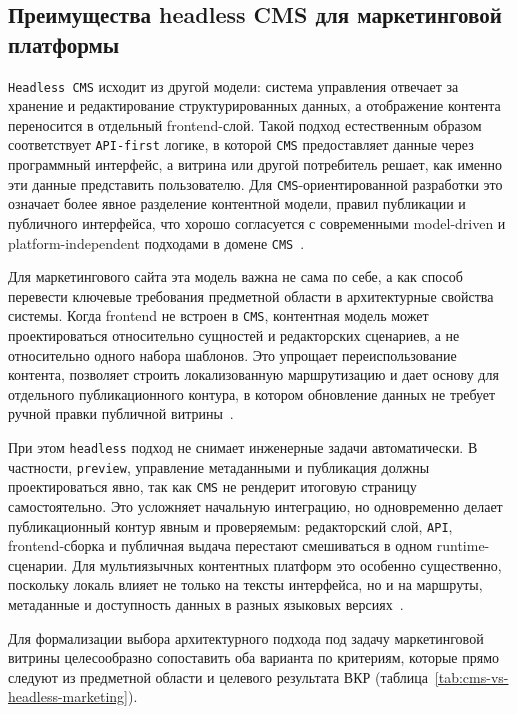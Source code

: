 \subsection{Преимущества headless CMS для маркетинговой платформы}

\texttt{Headless CMS} исходит из другой модели: система управления отвечает за хранение
и редактирование структурированных данных, а отображение контента переносится в отдельный
frontend-слой. Такой подход естественным образом соответствует \texttt{API-first} логике,
в которой \texttt{CMS} предоставляет данные через программный интерфейс, а витрина или
другой потребитель решает, как именно эти данные представить пользователю. Для
\texttt{CMS}-ориентированной разработки это означает более явное разделение контентной
модели, правил публикации и публичного интерфейса, что хорошо согласуется с современными
model-driven и platform-independent подходами в домене \texttt{CMS}~\cite{priefer2021cms-mdd-domain,gkantouna2019cms-oriented-modeling,filipe2016xis-cms}.

Для маркетингового сайта эта модель важна не сама по себе, а как способ перевести
ключевые требования предметной области в архитектурные свойства системы. Когда frontend
не встроен в \texttt{CMS}, контентная модель может проектироваться относительно сущностей
и редакторских сценариев, а не относительно одного набора шаблонов. Это упрощает
переиспользование контента, позволяет строить локализованную маршрутизацию и дает основу
для отдельного публикационного контура, в котором обновление данных не требует ручной
правки публичной витрины~\cite{santahuhta2022headless-cms,matjuhhin2026api-driven-cms,holcik2025headless-cloud}.

При этом \texttt{headless} подход не снимает инженерные задачи автоматически. В частности,
\texttt{preview}, управление метаданными и публикация должны проектироваться явно, так как
\texttt{CMS} не рендерит итоговую страницу самостоятельно. Это усложняет начальную
интеграцию, но одновременно делает публикационный контур явным и проверяемым: редакторский
слой, \texttt{API}, frontend-сборка и публичная выдача перестают смешиваться в одном
runtime-сценарии. Для мультиязычных контентных платформ это особенно существенно, поскольку
локаль влияет не только на тексты интерфейса, но и на маршруты, метаданные и доступность
данных в разных языковых версиях~\cite{santahuhta2022headless-cms,oleary2008multilingual-kms,gracia2012multilingual-web-data,solovev2023multilingual-web-app}.

Для формализации выбора архитектурного подхода под задачу маркетинговой витрины
целесообразно сопоставить оба варианта по критериям, которые прямо следуют из предметной
области и целевого результата ВКР (таблица~\ref{tab:cms-vs-headless-marketing}).

